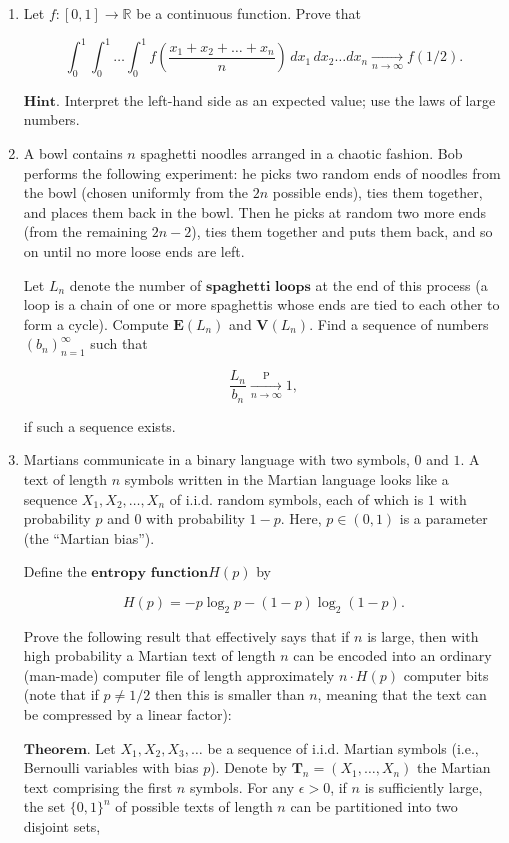\documentclass[11pt]{report}
\newcommand{\R}{\mathbb{R}}
\theoremstyle{plain}
\theoremstyle{definition}
\begin{document}
\begin{enumerate}[label=\arabic*.]
\item Let $f:[0,1]\to\R$ be a continuous function. Prove
that

\[
\int_0^1 \int_0^1 \ldots \int_0^1 f\left(\frac{x_1+x_2+\ldots+x_n}{n}\right)\,dx_1\,dx_2\ldots dx_n \xrightarrow[n\to\infty]{} f(1/2).
\]

\noindent $\textbf{Hint.}$ Interpret the left-hand side as an
expected value; use the laws of large numbers.

\item A bowl contains $n$ spaghetti noodles arranged in a
chaotic fashion. Bob performs the following
experiment: he picks two random ends of noodles from
the bowl (chosen uniformly from the $2n$ possible
ends), ties them together, and places them back in the
bowl. Then he picks at random two more ends (from the
remaining $2n-2$), ties them together and puts them
back, and so on until no more loose ends are left.

Let $L_n$ denote the number of
$\textbf{spaghetti loops}$ at the end of this process
(a loop is a chain of one or more spaghettis whose
ends are tied to each other to form a cycle). Compute
$\mathbf{E}(L_n)$ and $\mathbf{V}(L_n)$. Find a
sequence of numbers $(b_n)_{n=1}^\infty$ such that

\[
\frac{L_n}{b_n} \xrightarrow[n\to\infty]{\mathrm{P}} 1,
\]

\noindent if such a sequence exists.

\item Martians communicate in a binary language with two
symbols, $0$ and $1$. A text of length $n$ symbols
written in the Martian language looks like a sequence
$X_1, X_2, \ldots, X_n$ of i.i.d. random symbols,
each of which is $1$ with probability $p$ and $0$
with probability $1-p$. Here, $p\in(0,1)$ is a
parameter (the ``Martian bias'').

Define the $\textbf{entropy function}$$H(p)$ by

\[
H(p) = -p\log_2 p -(1-p)\log_2 (1-p).
\]

\noindent Prove the following result that effectively says that
if $n$ is large, then with high probability a Martian
text of length $n$ can be encoded into an ordinary
(man-made) computer file of length approximately
$n\cdot H(p)$ computer bits (note that if $p\neq 1/2$
then this is smaller than $n$, meaning that the text
can be compressed by a linear factor):

$\textbf{Theorem.}$ Let $X_1, X_2, X_3, \ldots$ be a
sequence of i.i.d. Martian symbols (i.e., Bernoulli
variables with bias $p$). Denote by
$\mathbf{T}_n=(X_1,\ldots,X_n)$ the Martian text
comprising the first $n$ symbols. For any
$\epsilon>0$, if $n$ is sufficiently large, the set
$\{0,1\}^n$ of possible texts of length $n$ can be
partitioned into two disjoint sets,


\end{enumerate}
\end{document}
